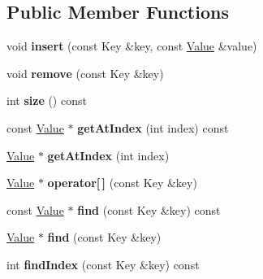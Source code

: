 \subsection*{Public Member Functions}
\begin{DoxyCompactItemize}
\item 
\mbox{\label{classbtHashMap_a15fc118df433a9b7f4350d42cd33bd13}} 
void {\bfseries insert} (const Key \&key, const \hyperlink{classValue}{Value} \&value)
\item 
\mbox{\label{classbtHashMap_aa42f8bdb95f77c52974d9998b41e0507}} 
void {\bfseries remove} (const Key \&key)
\item 
\mbox{\label{classbtHashMap_a48733b2de36eded2f5c845762aca2901}} 
int {\bfseries size} () const
\item 
\mbox{\label{classbtHashMap_aaf21fe2518b94d071fff58f4f2d8052d}} 
const \hyperlink{classValue}{Value} $\ast$ {\bfseries get\+At\+Index} (int index) const
\item 
\mbox{\label{classbtHashMap_a6a80cb0e97a1f5493877c78ceea058c2}} 
\hyperlink{classValue}{Value} $\ast$ {\bfseries get\+At\+Index} (int index)
\item 
\mbox{\label{classbtHashMap_af195fa3847a1159b3dc161f32fd09004}} 
\hyperlink{classValue}{Value} $\ast$ {\bfseries operator\mbox{[}$\,$\mbox{]}} (const Key \&key)
\item 
\mbox{\label{classbtHashMap_a5e13472314dfca4a427e1092d416c65e}} 
const \hyperlink{classValue}{Value} $\ast$ {\bfseries find} (const Key \&key) const
\item 
\mbox{\label{classbtHashMap_afe51e217996a94c176e59208b78ad90a}} 
\hyperlink{classValue}{Value} $\ast$ {\bfseries find} (const Key \&key)
\item 
\mbox{\label{classbtHashMap_a7c2015cfa4f25a86e48a7d34dfab72c5}} 
int {\bfseries find\+Index} (const Key \&key) const
\item 
\mbox{\label{classbtHashMap_a350c623ef89a0c7e8b542537f8d0c9f0}} 

\end{DoxyCompactItemize}

